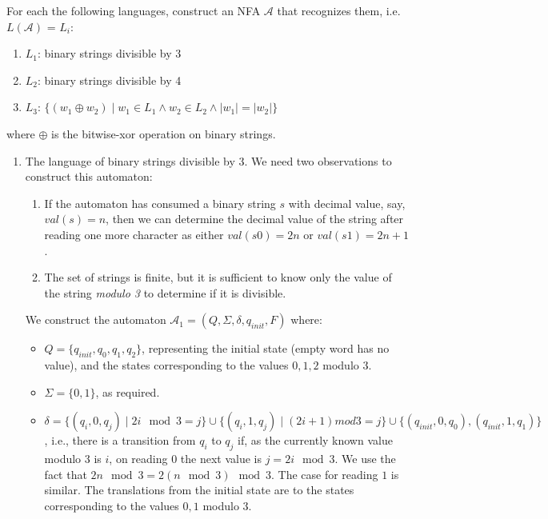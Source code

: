 

\begin{exercise}{}

  For each the following languages, construct an NFA \(\mathcal{A}\) that
  recognizes them, i.e. \(L(\mathcal{A})\) = \(L_i\):
  \begin{enumerate}
    \item \(L_1\): binary strings divisible by 3
    \item \(L_2\): binary strings divisible by 4
    \item \(L_3\): \(\{(w_1 \oplus w_2) \mid w_1 \in L_1 \land w_2 \in L_2 \land |w_1| = |w_2|\}\)
  \end{enumerate}
  where \(\oplus\) is the bitwise-xor operation on binary strings.
  
  \begin{solution}
    \begin{enumerate}
      \item The language of binary strings divisible by 3. We need two
      observations to construct this automaton:
      \begin{enumerate}
        \item If the automaton has consumed a binary string \(s\) with decimal
        value, say, \(val(s) = n\), then we can determine the decimal value of
        the string after reading one more character as either \(val(s0) = 2n\)
        or \(val(s1) = 2n + 1\).
        \item The set of strings is finite, but it is sufficient to know only
        the value of the string \emph{modulo 3} to determine if it is divisible.
      \end{enumerate}

      We construct the automaton \(\mathcal{A}_1 = (Q, \Sigma, \delta, q_{init}, F)\)
      where:
      \begin{itemize}
        \item \(Q = \{q_{init}, q_0, q_1, q_2\}\), representing the initial
        state (empty word has no value), and the states corresponding to the
        values \(0, 1, 2\) modulo 3.
        \item \(\Sigma = \{0, 1\}\), as required.
        \item \(\delta = \{(q_i, 0, q_j) \mid 2i \mod 3 = j\} \cup \{(q_i, 1,
        q_j) \mid (2i + 1) mod 3 = j\} \cup \{(q_{init}, 0, q_0), (q_{init}, 1,
        q_1)\}\), i.e., there is a transition from \(q_i\) to \(q_j\) if, as the
        currently known value modulo 3 is \(i\), on reading \(0\) the next value
        is \(j = 2i \mod 3\). We use the fact that \(2n \mod 3 = 2 (n \mod 3)
        \mod 3\). The case for reading \(1\) is similar. The translations from
        the initial state are to the states corresponding to the values \(0, 1\)
        modulo 3.


\end{itemize}
\end{enumerate}
\end{solution}
\end{exercise}
